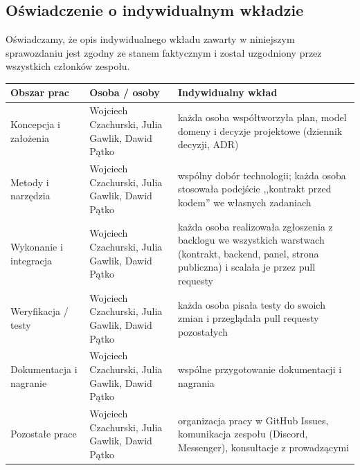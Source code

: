 \documentclass[11pt,a4paper,oneside]{article}
\newif\ifpodpowiedzi
\newcommand{\podpowiedz}[1]{\ifpodpowiedzi\par\begingroup\small\color{hintcolor}\textit{Wskazówka: #1}\par\endgroup\fi}
\newcommand{\studentA}{Wojciech Czachurski}
\newcommand{\studentB}{Julia Gawlik}
\newcommand{\studentC}{Dawid Pątko}
\begin{document}
\subsection{Oświadczenie o indywidualnym wkładzie}
Oświadczamy, że opis indywidualnego wkładu zawarty w niniejszym sprawozdaniu jest zgodny ze stanem faktycznym i został uzgodniony przez wszystkich członków zespołu.
\podpowiedz{Wskaż konkretne obowiązki poszczególnych osób, a nie wyłącznie procenty. Obszary dostosuj do projektu; przy zadaniach wspólnych określ wkład każdej osoby. Tabela uzupełnia opis prac i nie powinna mu przeczyć.}
\begin{tabularx}{\textwidth}{@{}p{} Y Y@{}}
\toprule
Obszar prac & Osoba / osoby & Indywidualny wkład\\
\midrule
Koncepcja i założenia & \studentA, \studentB, \studentC & każda osoba współtworzyła plan, model domeny i decyzje projektowe (dziennik decyzji, ADR)\\
Metody i narzędzia & \studentA, \studentB, \studentC & wspólny dobór technologii; każda osoba stosowała podejście ,,kontrakt przed kodem'' we własnych zadaniach\\
Wykonanie i integracja & \studentA, \studentB, \studentC & każda osoba realizowała zgłoszenia z backlogu we wszystkich warstwach (kontrakt, backend, panel, strona publiczna) i scalała je przez pull requesty\\
Weryfikacja / testy & \studentA, \studentB, \studentC & każda osoba pisała testy do swoich zmian i przeglądała pull requesty pozostałych\\
Dokumentacja i nagranie & \studentA, \studentB, \studentC & wspólne przygotowanie dokumentacji i nagrania\\
Pozostałe prace & \studentA, \studentB, \studentC & organizacja pracy w GitHub Issues, komunikacja zespołu (Discord, Messenger), konsultacje z prowadzącymi\\
\bottomrule
\end{tabularx}
\podpisy
\end{document}
